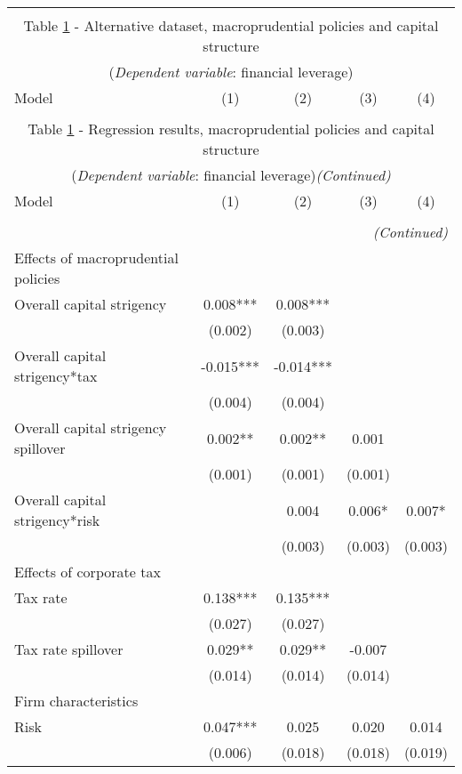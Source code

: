 \begin{longtable}{lcccc}\\
	\label{reg:barth}\\
	\multicolumn{5}{c}{Table \ref{reg:barth} - Alternative dataset, macroprudential policies and capital structure}\\
	\multicolumn{5}{c}{(\textit{Dependent variable}: financial leverage)}
	\\ \hline \hline
	Model & (1) & (2) & (3) & (4)  \\ \hline
	&  &  &  \\ \endfirsthead
	\multicolumn{5}{c}{Table \ref{reg:barth} - Regression results, macroprudential policies and capital structure }\\
	\multicolumn{5}{c}{(\textit{Dependent variable}: financial leverage)\textit{(Continued)}}
	\\ \hline \hline
	Model & (1) & (2) & (3) & (4)  \\ \hline 
	&  &  &  & \\ \endhead
	\hline
	\multicolumn{5}{r}{{\textit{(Continued)}}}\\ \endfoot	
	\endlastfoot
	Effects of macroprudential policies  &  &  &  \\
\quad Overall capital strigency & 0.008*** & 0.008*** &  &  \\
 & (0.002) & (0.003) &  &  \\
\quad Overall capital strigency*tax & -0.015*** & -0.014*** &  &  \\
 & (0.004) & (0.004) &  &  \\
\quad Overall capital strigency spillover & 0.002** & 0.002** & 0.001 &  \\
 & (0.001) & (0.001) & (0.001) &  \\
\quad Overall capital strigency*risk &  & 0.004 & 0.006* & 0.007* \\
 &  & (0.003) & (0.003) & (0.003) \\
   Effects of corporate tax &  &  &  \\
\quad Tax rate & 0.138*** & 0.135*** &  &  \\
 & (0.027) & (0.027) &  &  \\
\quad Tax rate spillover & 0.029** & 0.029** & -0.007 &  \\
 & (0.014) & (0.014) & (0.014) &  \\
    Firm characteristics &  &  &  \\
\quad Risk & 0.047*** & 0.025 & 0.020 & 0.014 \\
 & (0.006) & (0.018) & (0.018) & (0.019) \\

\end{longtable}
